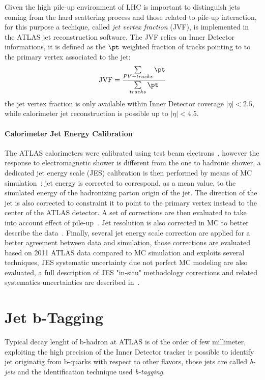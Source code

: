 Given the high pile-up environment of LHC  is important to distinguish jets coming from the hard scattering process and those
related to pile-up interaction, for this purpose a techique, called \emph{jet vertex fraction} (JVF), is implemented in the 
ATLAS jet reconstruction software.
The JVF relies on Inner Detector informations, it is defined as the $\pt$ weighted fraction of tracks pointing
to to the primary vertex associated to the jet:
\begin{equation}
\text{JVF} = \frac{\sum\limits_{PV-tracks}\pt}{\sum\limits_{tracks}\pt}
\end{equation} 
the jet vertex fraction  is only available within Inner Detector coverage $|\eta| < 2.5$,
while calorimeter jet reconstruction is possible up to $|\eta| < 4.5$.

\paragraph{Calorimeter Jet Energy Calibration}
The ATLAS calorimeters were calibrated using test beam electrons~\cite{EMcalibration}, however  the response
to electromagnetic shower  is different from the one to hadronic shower, a dedicated jet energy scale
(JES) calibration is then performed by means of MC simulation~\cite{jesinsitu}: 
jet energy is corrected to correspond, as a mean value, to the simulated energy 
of the hadronizing parton origin of the jet. The direction of the jet is also corrected to constraint it to point
to the primary vertex instead to the center of the ATLAS detector. A set of corrections are then evaluated to take into account
effect of pile-up~\cite{jespileup, jesarea}. Jet resolution is also corrected in MC to better describe the data~\cite{jer}. 
Finally, several jet energy scale correction are applied for a better agreement between 
data and simulation, those corrections are evaluated based on 2011 ATLAS data compared to MC simulation and 
exploits several techniques, JES systematic uncertainty due not perfect MC modeling are also evaluated,
a full description of JES "in-situ" methodology corrections and related systematics uncertainties are 
described in~\cite{jesinsitu, JES}. %


\section{Jet b-Tagging}
Typical decay lenght of b-hadron at ATLAS is of the order of few millimeter, exploiting the high precision of the
Inner Detector tracker is possible to identify jet originatig from b-quarks with respect to other flavors, 
those jets are called \emph{b-jets} and the identification technique used \emph{b-tagging}.

